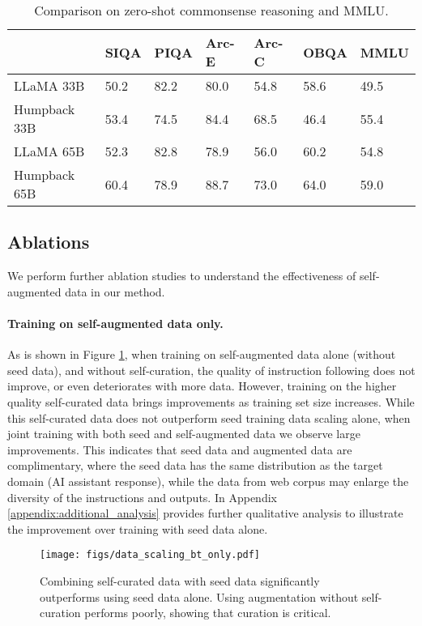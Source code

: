 \begin{table}[h]
  \caption{Comparison on zero-shot commonsense reasoning and MMLU.
  \label{tab:commonsense_eval}
  }
  \centering
  \small
  \begin{tabular}{lllllll}
    \toprule
        & \textbf{SIQA} & \textbf{PIQA}  & \textbf{Arc-E} & \textbf{Arc-C} & \textbf{OBQA} & \textbf{MMLU}  \\
    \midrule
    LLaMA 33B & 50.2  & 82.2 & 80.0 & 54.8 & 58.6 & 49.5 \\
    Humpback 33B & 53.4  & 74.5 & 84.4 & 68.5  & 46.4 & 55.4 \\
    LLaMA 65B & 52.3  & 82.8 & 78.9 & 56.0 & 60.2  & 54.8 \\
    Humpback 65B & 60.4  & 78.9 & 88.7 &  73.0 & 64.0 & 59.0 \\
    \bottomrule
  \end{tabular}
  \vspace{1mm}
\end{table}

\subsection{Ablations}
We perform further ablation studies to understand the effectiveness of self-augmented data in our method. 

\paragraph{Training on self-augmented data only.} As is shown in Figure \ref{fig:aug_data_only}, when training on self-augmented data alone (without seed data), and without self-curation, the quality of instruction following does not improve, or even  deteriorates with more data. However, training on the higher quality self-curated data brings improvements as training set size increases. While this self-curated data  does not outperform seed training data scaling alone, when joint training with both seed and self-augmented data we observe large improvements. This indicates that seed data and augmented data are complimentary, where the seed data has the same distribution as the target domain (AI assistant response), while the data from web corpus may enlarge the diversity of the instructions and outputs. In Appendix \ref{appendix:additional_analysis} provides further qualitative analysis to illustrate the improvement over training with seed data alone.

\begin{figure}
  \centering
  \texttt{[image: figs/data\_scaling\_bt\_only.pdf]}
  \caption{Combining self-curated data with seed data significantly outperforms using seed data alone. Using augmentation without self-curation performs poorly, showing that curation is critical. 
  }
  \label{fig:aug_data_only}
\end{figure}

